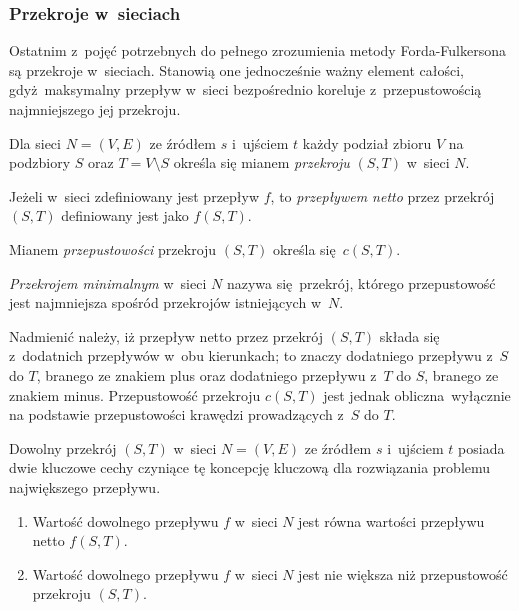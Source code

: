 \subsubsection{\textbf{Przekroje w~sieciach}}
\par{
  Ostatnim z~pojęć potrzebnych do pełnego zrozumienia metody Forda-Fulkersona są przekroje w~sieciach.
  Stanowią one jednocześnie ważny element całości, gdyż maksymalny przepływ w~sieci bezpośrednio koreluje z~przepustowością najmniejszego jej przekroju.
  \begin{definition}
    Dla sieci $N=(V, E)$ ze źródłem $s$ i~ujściem $t$ każdy podział zbioru $V$ na podzbiory $S$ oraz $T=V\setminus S$ określa się mianem \emph{przekroju} $(S,T)$ w~sieci $N$.

    Jeżeli w~sieci zdefiniowany jest przepływ $f$, to \emph{przepływem netto} przez przekrój $(S, T)$ definiowany jest jako $f(S, T)$.

    Mianem \emph{przepustowości} przekroju $(S, T)$ określa się $c(S, T)$.

    \emph{Przekrojem minimalnym} w~sieci $N$ nazywa się przekrój, którego przepustowość jest najmniejsza spośród przekrojów istniejących w~$N$.
  \end{definition}
}
\par{
  Nadmienić należy, iż przepływ netto przez przekrój $(S, T)$ składa się z~dodatnich przepływów w~obu kierunkach; to znaczy dodatniego przepływu z~$S$ do $T$, branego ze znakiem plus oraz dodatniego przepływu z~$T$ do $S$, branego ze znakiem minus.
  Przepustowość przekroju $c(S, T)$ jest jednak obliczna wyłącznie na podstawie przepustowości krawędzi prowadzących z~$S$ do $T$.
}
\par{
  Dowolny przekrój $(S, T)$ w~sieci $N=(V, E)$ ze źródłem $s$ i~ujściem $t$ posiada dwie kluczowe cechy czyniące tę koncepcję kluczową dla rozwiązania problemu największego przepływu.
  \begin{enumerate}
    \item Wartość dowolnego przepływu $f$ w~sieci $N$ jest równa wartości przepływu netto $f(S,T)$.
    \item Wartość dowolnego przepływu $f$ w~sieci $N$ jest nie większa niż przepustowość przekroju $(S, T)$.
  \end{enumerate}
}
